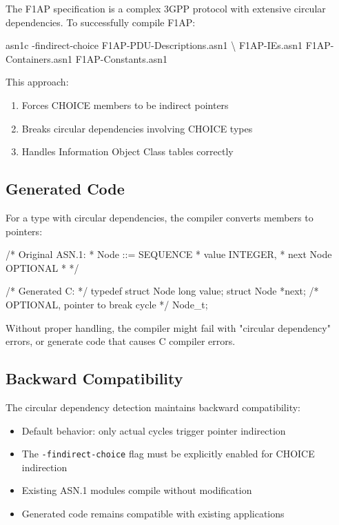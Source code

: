 \documentclass[english,oneside,12pt]{book}
\begin{document}
The F1AP specification is a complex 3GPP protocol with extensive circular dependencies. 
To successfully compile F1AP:

\begin{bash}
asn1c -findirect-choice F1AP-PDU-Descriptions.asn1 \textbackslash
      F1AP-IEs.asn1 F1AP-Containers.asn1 F1AP-Constants.asn1
\end{bash}

This approach:
\begin{enumerate}
\item Forces CHOICE members to be indirect pointers
\item Breaks circular dependencies involving CHOICE types
\item Handles Information Object Class tables correctly
\end{enumerate}

\subsection*{Generated Code}

For a type with circular dependencies, the compiler converts members to pointers:

\begin{example}
/* Original ASN.1:
 * Node ::= SEQUENCE {
 *     value   INTEGER,
 *     next    Node OPTIONAL
 * }
 */

/* Generated C: */
typedef struct Node {
    long      value;
    struct Node  *next;  /* OPTIONAL, pointer to break cycle */
} Node_t;
\end{example}

Without proper handling, the compiler might fail with "circular dependency" errors, or 
generate code that causes C compiler errors.

\subsection*{Backward Compatibility}

The circular dependency detection maintains backward compatibility:
\begin{itemize}
\item Default behavior: only actual cycles trigger pointer indirection
\item The \texttt{-findirect-choice} flag must be explicitly enabled for CHOICE indirection
\item Existing ASN.1 modules compile without modification
\item Generated code remains compatible with existing applications
\end{itemize}
\end{document}
